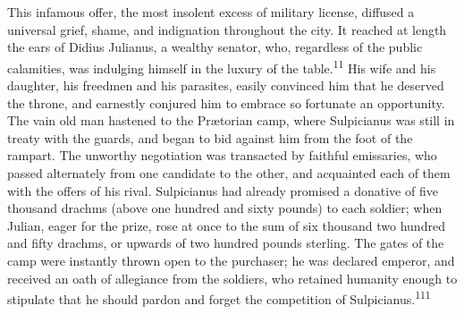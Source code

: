 This infamous offer, the most insolent excess of military
license, diffused a universal grief, shame, and indignation
throughout the city. It reached at length the ears of Didius
Julianus, a wealthy senator, who, regardless of the public
calamities, was indulging himself in the luxury of the table.\textsuperscript{11}
His wife and his daughter, his freedmen and his parasites, easily
convinced him that he deserved the throne, and earnestly conjured
him to embrace so fortunate an opportunity. The vain old man
hastened to the Prætorian camp, where Sulpicianus was still in
treaty with the guards, and began to bid against him from the
foot of the rampart. The unworthy negotiation was transacted by
faithful emissaries, who passed alternately from one candidate to
the other, and acquainted each of them with the offers of his
rival. Sulpicianus had already promised a donative of five
thousand drachms (above one hundred and sixty pounds) to each
soldier; when Julian, eager for the prize, rose at once to the
sum of six thousand two hundred and fifty drachms, or upwards of
two hundred pounds sterling. The gates of the camp were instantly
thrown open to the purchaser; he was declared emperor, and
received an oath of allegiance from the soldiers, who retained
humanity enough to stipulate that he should pardon and forget the
competition of Sulpicianus.\textsuperscript{111}



